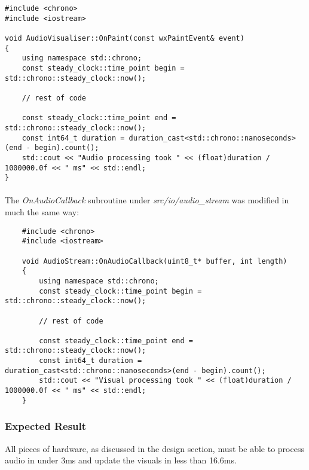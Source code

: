\begin{verbatim}
#include <chrono>
#include <iostream>
	
void AudioVisualiser::OnPaint(const wxPaintEvent& event)
{
	using namespace std::chrono;
	const steady_clock::time_point begin = std::chrono::steady_clock::now();
	
	// rest of code
	
	const steady_clock::time_point end = std::chrono::steady_clock::now();
	const int64_t duration = duration_cast<std::chrono::nanoseconds>(end - begin).count();
	std::cout << "Audio processing took " << (float)duration / 1000000.0f << " ms" << std::endl;
}
\end{verbatim}

\pagebreak
\paragraph{}
The \textit{OnAudioCallback} subroutine under \textit{src/io/audio\_stream} was modified in much the same way:
\begin{verbatim}
	#include <chrono>
	#include <iostream>
	
	void AudioStream::OnAudioCallback(uint8_t* buffer, int length)
	{
		using namespace std::chrono;
		const steady_clock::time_point begin = std::chrono::steady_clock::now();
		
		// rest of code
		
		const steady_clock::time_point end = std::chrono::steady_clock::now();
		const int64_t duration = duration_cast<std::chrono::nanoseconds>(end - begin).count();
		std::cout << "Visual processing took " << (float)duration / 1000000.0f << " ms" << std::endl;
	}
\end{verbatim}

\subsubsection*{Expected Result}
All pieces of hardware, as discussed in the design section, must be able to process audio in under 3ms and update the visuals in less than 16.6ms.

